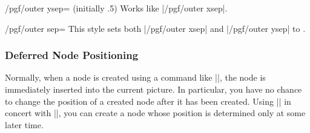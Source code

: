 \begin{key}{/pgf/outer ysep= (initially .5\string\pgflinewidth)}
    Works like |/pgf/outer xsep|.
\end{key}

\begin{key}{/pgf/outer sep=}
    This style sets both |/pgf/outer xsep| and |/pgf/outer ysep| to
    .
\end{key}


\subsubsection{Deferred Node Positioning}
\label{section-shapes-deferred-node-positioning}

Normally, when a node is created using a command like |\pgfnode|, the node is
immediately inserted into the current picture. In particular, you have no
chance to change the position of a created node after it has been created.
Using |\pgfpositionnodelater| in concert with |\pgfpositionnodenow|, you can
create a node whose position is determined only at some later time.

